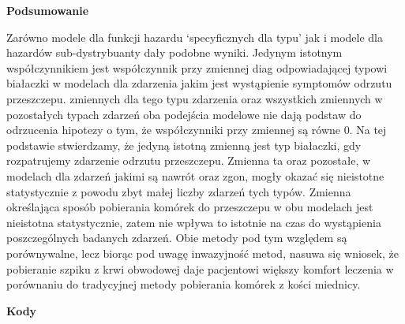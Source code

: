\documentclass[]{article}
\begin{document}
\vspace{10pt}

\textbf{Podsumowanie}

Zarówno modele dla funkcji hazardu `specyficznych dla typu' jak i modele
dla hazardów sub-dystrybuanty dały podobne wyniki. Jedynym istotnym
współczynnikiem jest współczynnik przy zmiennej \textsf{diag}
odpowiadającej typowi białaczki w modelach dla zdarzenia jakim jest
wystąpienie symptomów odrzutu przeszczepu. 
zmiennych dla tego typu zdarzenia oraz wszystkich zmiennych w
pozostałych typach zdarzeń oba podejścia modelowe nie dają podstaw do
odrzucenia hipotezy o tym, że współczynniki przy zmiennej są równe 0. Na
tej podstawie stwierdzamy, że jedyną istotną zmienną jest typ białaczki,
gdy rozpatrujemy zdarzenie odrzutu przeszczepu. Zmienna ta oraz
pozostałe, w modelach dla zdarzeń jakimi są nawrót oraz zgon, mogły
okazać się nieistotne statystycznie z powodu zbyt małej liczby zdarzeń
tych typów.\newline
Zmienna określająca sposób pobierania komórek do przeszczepu w obu
modelach jest nieistotna statystycznie, zatem nie wpływa to istotnie na
czas do wystąpienia poszczególnych badanych zdarzeń. Obie metody pod tym
względem są porównywalne, lecz biorąc pod uwagę inwazyjność metod,
nasuwa się wniosek, że pobieranie szpiku z krwi obwodowej daje
pacjentowi większy komfort leczenia w porównaniu do tradycyjnej metody
pobierania komórek z kości miednicy.

\newpage
\small
\textbf{Kody}
\end{document}
